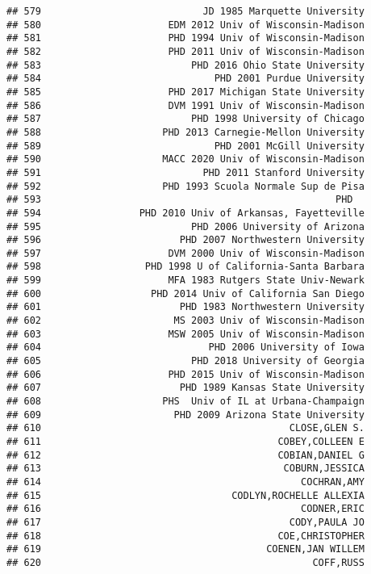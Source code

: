 \documentclass[
]{article}
\begin{document}
\begin{verbatim}
## 579                            JD 1985 Marquette University
## 580                      EDM 2012 Univ of Wisconsin-Madison
## 581                      PHD 1994 Univ of Wisconsin-Madison
## 582                      PHD 2011 Univ of Wisconsin-Madison
## 583                          PHD 2016 Ohio State University
## 584                              PHD 2001 Purdue University
## 585                      PHD 2017 Michigan State University
## 586                      DVM 1991 Univ of Wisconsin-Madison
## 587                          PHD 1998 University of Chicago
## 588                     PHD 2013 Carnegie-Mellon University
## 589                              PHD 2001 McGill University
## 590                     MACC 2020 Univ of Wisconsin-Madison
## 591                            PHD 2011 Stanford University
## 592                     PHD 1993 Scuola Normale Sup de Pisa
## 593                                                   PHD  
## 594                 PHD 2010 Univ of Arkansas, Fayetteville
## 595                          PHD 2006 University of Arizona
## 596                        PHD 2007 Northwestern University
## 597                      DVM 2000 Univ of Wisconsin-Madison
## 598                  PHD 1998 U of California-Santa Barbara
## 599                      MFA 1983 Rutgers State Univ-Newark
## 600                   PHD 2014 Univ of California San Diego
## 601                        PHD 1983 Northwestern University
## 602                       MS 2003 Univ of Wisconsin-Madison
## 603                      MSW 2005 Univ of Wisconsin-Madison
## 604                             PHD 2006 University of Iowa
## 605                          PHD 2018 University of Georgia
## 606                      PHD 2015 Univ of Wisconsin-Madison
## 607                        PHD 1989 Kansas State University
## 608                     PHS  Univ of IL at Urbana-Champaign
## 609                       PHD 2009 Arizona State University
## 610                                           CLOSE,GLEN S.
## 611                                         COBEY,COLLEEN E
## 612                                         COBIAN,DANIEL G
## 613                                          COBURN,JESSICA
## 614                                             COCHRAN,AMY
## 615                                 CODLYN,ROCHELLE ALLEXIA
## 616                                             CODNER,ERIC
## 617                                           CODY,PAULA JO
## 618                                         COE,CHRISTOPHER
## 619                                       COENEN,JAN WILLEM
## 620                                               COFF,RUSS

\end{verbatim}
\end{document}
